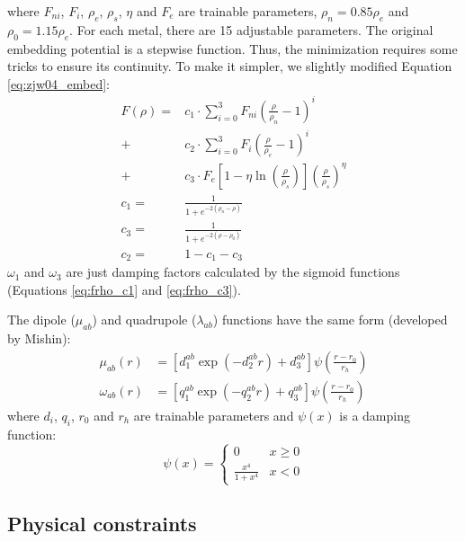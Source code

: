 \documentclass[prb,reprint]{revtex4-2}
\begin{document}
where $F_{ni}$, $F_{i}$, $\rho_e$, $\rho_s$, $\eta$ and $F_{e}$ are trainable 
parameters, $\rho_n=0.85\rho_e$ and $\rho_0=1.15\rho_e$. For each metal, there 
are 15 adjustable parameters. The original embedding potential is a stepwise 
function. Thus, the minimization requires some tricks to ensure its continuity.
To make it simpler, we slightly modified Equation \ref{eq:zjw04_embed}:
\begin{align}
\label{eq:zjw04xc_embed}
F(\rho) 
= & c_1 \cdot
\sum_{i=0}^{3}{F_{ni}\left( \frac{\rho}{\rho_n} - 1 \right)^{i}} \nonumber \\
+ & c_2 \cdot 
\sum_{i=0}^{3}{F_{i}\left( \frac{\rho}{\rho_e} - 1 \right)^{i}} \nonumber \\
+ & c_3 \cdot
F_{e}\left[1 - \eta\ln\left( \frac{\rho}{\rho_s}\right)\right]
(\frac{\rho}{\rho_s})^{\eta} \\
\label{eq:frho_c1}
c_{1} = & \frac{1}{1 + e^{-2\left(\rho_{n} - \rho\right)}} \\
\label{eq:frho_c3}
c_{3} = & \frac{1}{1 + e^{-2\left(\rho - \rho_{0}\right)}} \\
c_{2} = & 1 - c_1 - c_3
\end{align}
$\omega_1$ and $\omega_3$ are just damping factors calculated by the sigmoid 
functions (Equations \ref{eq:frho_c1} and \ref{eq:frho_c3}).

The dipole ($\mu_{ab}$) and quadrupole ($\lambda_{ab}$) functions have the same 
form (developed by Mishin):
\begin{align}
\label{eq:adp_dipole}
\mu_{ab}(r) & = \left[
    d_{1}^{ab} \exp\left( -d_{2}^{ab}r \right) + d_{3}^{ab}
\right] \psi\left( \frac{r - r_{0}}{r_{h}} \right) \\
\omega_{ab}(r) & = \left[
    q_{1}^{ab} \exp\left( -q_{2}^{ab}r \right) + q_{3}^{ab}
\right] \psi\left( \frac{r - r_{0}}{r_{h}} \right)
\end{align}
where $d_{i}$, $q_{i}$, $r_0$ and $r_{h}$ are trainable parameters and $\psi(x)$
is a damping function:
\begin{equation}
\label{eq:mishin_cutoff}
\psi(x) = \begin{cases}
    0 & x \ge 0 \\
    \frac{x^4}{1 + x^4} & x < 0 
\end{cases}
\end{equation}

\subsection{Physical constraints}
\label{sec:constraints}
\end{document}
